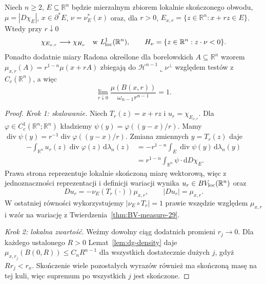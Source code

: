 \begin{lemat}
\label{lem:dg-blowup}
Niech $n\ge2$, $E\subseteq\mathbb R^n$ będzie
mierzalnym zbiorem lokalnie skończonego obwodu,
$\mu=|D\chi_E|$, $x\in\partial^*E$,
$\nu=\nu_E^*(x)$ oraz, dla $r>0$,
$E_{x,r}=\{z\in\mathbb R^n:x+rz\in E\}$.
Wtedy przy $r\downarrow0$
\[
 \chi_{E_{x,r}}\longrightarrow\chi_{H_\nu}
 \quad\text{w }L^1_{\rm loc}(\mathbb R^n),\qquad
 H_\nu=\{z\in\mathbb R^n:z\cdot\nu<0\}.
\]
Ponadto dodatnie miary Radona określone dla
borelowskich $A\subseteq\mathbb R^n$ wzorem
$\mu_{x,r}(A)=r^{1-n}\mu(x+rA)$
zbiegają do $\mathcal H^{n-1}\llcorner\nu^\perp$
względem testów z $C_c(\mathbb R^n)$, a więc
\[
 \lim_{r\downarrow0}
 \frac{\mu(B(x,r))}{\omega_{n-1}r^{n-1}}=1.
\]
\end{lemat}
\begin{proof}
\emph{Krok 1: skalowanie.}
Niech $T_r(z)=x+rz$ i $u_r=\chi_{E_{x,r}}$.
Dla $\varphi\in C_c^1(\mathbb R^n;\mathbb R^n)$
kładziemy $\psi(y)=\varphi((y-x)/r)$.
Mamy $\operatorname{div}\psi(y)=
r^{-1}\operatorname{div}\varphi((y-x)/r)$.
Zmiana zmiennych $y=T_r(z)$ daje
\begin{align*}
 -\int_{\mathbb R^n}u_r(z)\operatorname{div}\varphi(z)
 \,\mathrm d\lambda_n(z)
 &=-r^{1-n}\int_E\operatorname{div}\psi(y)
 \,\mathrm d\lambda_n(y)\\
 &=r^{1-n}\int_{\mathbb R^n}\psi\cdot\mathrm dD\chi_E.
\end{align*}
Prawa strona reprezentuje lokalnie skończoną
miarę wektorową, więc z jednoznaczności
reprezentacji i definicji wariacji wynika
$u_r\in BV_{\rm loc}(\mathbb R^n)$ oraz
\[
 Du_r=-\nu_E(T_r(\cdot))\mu_{x,r},
 \qquad |Du_r|=\mu_{x,r}.
\]
W ostatniej równości wykorzystujemy
$|\nu_E\circ T_r|=1$ prawie wszędzie względem
$\mu_{x,r}$ i wzór na wariację z
Twierdzenia~\ref{thm:BV-measure-29}.

\emph{Krok 2: lokalna zwartość.}
Weźmy dowolny ciąg dodatnich promieni $r_j\to0$.
Dla każdego ustalonego $R>0$ Lemat~\ref{lem:dg-density}
daje
$\mu_{x,r_j}(B(0,R))\le C_nR^{n-1}$
dla wszystkich dostatecznie dużych $j$,
gdyż $Rr_j<r_x$. Skończenie wiele pozostałych
wyrazów również ma skończoną masę na tej kuli,
więc supremum po wszystkich $j$ jest skończone.


\end{proof}
